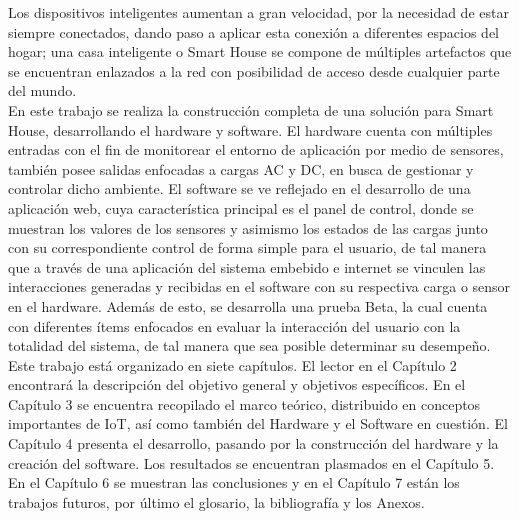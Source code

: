  Los dispositivos inteligentes aumentan a gran velocidad, por la necesidad de estar siempre conectados, dando paso a aplicar esta conexión a diferentes espacios del hogar; una casa inteligente o Smart House se compone de múltiples artefactos que se encuentran enlazados a la red con posibilidad de acceso desde cualquier parte del mundo. \\
 
 En este trabajo se realiza la construcción completa de una solución para Smart House, desarrollando el hardware y software. El hardware cuenta con múltiples entradas con el fin de monitorear el entorno de aplicación por medio de sensores, también posee salidas enfocadas a cargas AC y DC, en busca de gestionar y controlar dicho ambiente. El software se ve reflejado en el desarrollo de una aplicación web, cuya característica principal es el panel de control, donde se muestran los valores de los sensores y asimismo los estados de las cargas junto con su correspondiente control de forma simple para el usuario, de tal manera que a través de una aplicación del sistema embebido e internet se vinculen las interacciones generadas y recibidas en el software con su respectiva carga o sensor en el hardware. Además de esto, se desarrolla una prueba Beta, la cual cuenta con diferentes ítems enfocados en evaluar la interacción del usuario con la totalidad del sistema, de tal manera que sea posible determinar su desempeño.\\
 
 Este trabajo está organizado en siete capítulos. El lector en el Capítulo 2 encontrará la descripción del objetivo general y objetivos específicos. En el Capítulo 3 se encuentra recopilado el marco teórico, distribuido en conceptos importantes de IoT, así como también del Hardware y el Software en cuestión. El Capítulo 4 presenta el desarrollo, pasando por la construcción del hardware y la creación del software. Los resultados se encuentran plasmados en el Capítulo 5. En el Capítulo 6 se muestran las conclusiones y en el Capítulo 7 están los trabajos futuros, por último el glosario, la bibliografía y los Anexos.\\
 
